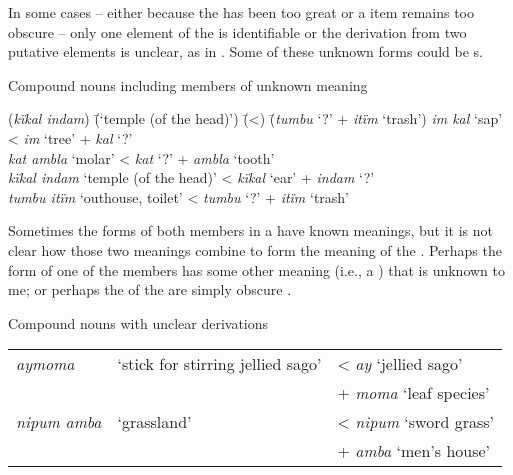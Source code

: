 In some cases -- either because the  has been too great or a  item remains too obscure -- only one element of the  is identifiable or the  derivation from two putative elements is unclear, as in . Some of these unknown forms could be s.



\ea%
    \label{ex:nouns:45b}
          Compound nouns including members of unknown meaning\\
\begin{tabbing}
{(\textit{kïkal indam})} \= {(‘temple (of the head)’)} \= {(<)} \= {(\textit{tumbu} ‘?’ + \textit{itïm} ‘trash’)}\kill
{\textit{im kal}} \> {‘sap’} \> {<} \> {\textit{im} ‘tree’ + \textit{kal} ‘?’}\\
{\textit{kat ambla}} \> {‘molar’} \> {<} \> {\textit{kat} ‘?’ + \textit{ambla} ‘tooth’}\\
{\textit{kïkal indam}} \> {‘temple (of the head)’} \> {<} \> {\textit{kïkal} ‘ear’ + \textit{indam} ‘?’}\\
{\textit{tumbu itïm}} \> {‘outhouse, toilet’} \> {<} \> {\textit{tumbu} ‘?’ + \textit{itïm} ‘trash’}
\end{tabbing}
\z

Sometimes the forms of both members in a  have known meanings, but it is not clear how those two meanings combine to form the meaning of the . Perhaps the form of one of the  members has some other meaning (i.e., a ) that is unknown to me; or perhaps the  of the  are simply obscure .


\ea%
    \label{ex:nouns:45c}
          Compound nouns with unclear derivations\\
    \begin{tabular}[t]{lll}
    \textit{aymoma}   &  ‘stick for stirring jellied sago’ & {< \textit{ay} ‘jellied sago’}\\
    & & {+ \textit{moma} ‘leaf species’}\\
  \textit{nipum amba}   &  ‘grassland’ & {< \textit{nipum} ‘sword grass’}\\
  & & {+ \textit{amba} ‘men’s house’}\\
\end{tabular}
\z

